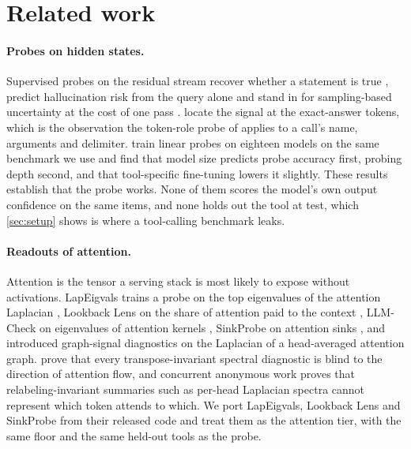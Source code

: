 \section{Related work}
\label{sec:related}

\paragraph{Probes on hidden states.}
Supervised probes on the residual stream recover whether a statement is true \citep{azaria2023internal,marks2024geometry}, predict hallucination risk from the query alone \citep{ji2024internal} and stand in for sampling-based uncertainty at the cost of one pass \citep{kossen2024sep}. \citet{orgad2025know} locate the signal at the exact-answer tokens, which is the observation the token-role probe of \citet{healy2026internal} applies to a call's name, arguments and delimiter. \citet{yeats2026calls} train linear probes on eighteen models on the same benchmark we use and find that model size predicts probe accuracy first, probing depth second, and that tool-specific fine-tuning lowers it slightly. These results establish that the probe works. None of them scores the model's own output confidence on the same items, and none holds out the tool at test, which \cref{sec:setup} shows is where a tool-calling benchmark leaks.

\paragraph{Readouts of attention.}
Attention is the tensor a serving stack is most likely to expose without activations. LapEigvals trains a probe on the top eigenvalues of the attention Laplacian \citep{binkowski2025lapeigvals}, Lookback Lens on the share of attention paid to the context \citep{chuang2024lookback}, LLM-Check on eigenvalues of attention kernels \citep{sriramanan2024llmcheck}, SinkProbe on attention sinks \citep{binkowski2026sinks}, and \citet{noel2025gsp} introduced graph-signal diagnostics on the Laplacian of a head-averaged attention graph. \citet{dahlem2026transport} prove that every transpose-invariant spectral diagnostic is blind to the direction of attention flow, and concurrent anonymous work proves that relabeling-invariant summaries such as per-head Laplacian spectra cannot represent which token attends to which. We port LapEigvals, Lookback Lens and SinkProbe from their released code and treat them as the attention tier, with the same floor and the same held-out tools as the probe.

